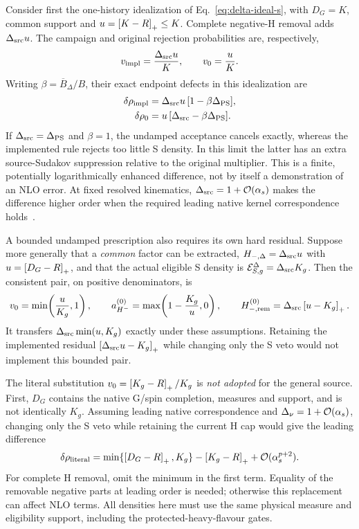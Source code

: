 Consider first the one-history idealization of
Eq.~\eqref{eq:delta-ideal-s}, with $D_G=K$, common support and
$u=\left[K-R\right]_+\leq K$.
Complete negative-H removal adds $\Delta_{\rm src}u$.
The campaign and original rejection probabilities are, respectively,
\begin{equation}
 v_{\rm impl}=\frac{\Delta_{\rm src}u}{K},
 \qquad v_0=\frac{u}{K}.
 \label{eq:delta-audit-veto}
\end{equation}
Writing $\beta=\overline B_\Delta/B$, their exact endpoint defects in
this idealization are
\begin{align}
 \delta\rho_{\rm impl}
   &=\Delta_{\rm src}u\,[1-\beta\Delta_{\rm PS}],\\
 \delta\rho_0&=u\,[\Delta_{\rm src}-\beta\Delta_{\rm PS}].
 \label{eq:delta-audit-defects}
\end{align}
If $\Delta_{\rm src}=\Delta_{\rm PS}$ and $\beta=1$, the undamped
acceptance cancels exactly, whereas the implemented rule rejects too
little S density. In this limit the latter has an extra source-Sudakov
suppression relative to the original multiplier.
This is a finite, potentially logarithmically enhanced difference,
not by itself a demonstration of an NLO error.
At fixed resolved kinematics, $\Delta_{\rm src}=1+\mathcal O(\alpha_s)$
makes the difference higher order when the required leading native
kernel correspondence holds~\cite[Eqs.~(3.6)--(3.8)]{DeltaMatching}.

A bounded undamped prescription also requires its own hard residual.
Suppose more generally that a \emph{common} factor can be extracted,
$H_{-,\Delta}=\Delta_{\rm src}u$ with
$u=\left[D_G-R\right]_+$, and that the actual eligible S density is
$\mathcal E_{S,g}^\Delta=\Delta_{\rm src}K_g$.
Then the consistent pair, on positive denominators, is
\begin{equation}
 v_0=\min\!\left(\frac{u}{K_g},1\right),\qquad
 a_{H^-}^{(0)}=\max\!\left(1-\frac{K_g}{u},0\right),\qquad
 H_{-,\rm rem}^{(0)}=\Delta_{\rm src}\left[u-K_g\right]_+.
 \label{eq:delta-audit-cap}
\end{equation}
It transfers $\Delta_{\rm src}\min(u,K_g)$ exactly under these
assumptions. Retaining the implemented residual
$\left[\Delta_{\rm src}u-K_g\right]_+$ while changing only the S veto would
not implement this bounded pair.

The literal substitution $v_0=\left[K_g-R\right]_+/K_g$ is \emph{not adopted}
for the general source. First, $D_G$ contains the native G/spin
completion, measures and support, and is not identically $K_g$.
Assuming leading native correspondence and $\Delta_\nu=1+\mathcal O(\alpha_s)$,
changing only the S veto while retaining the current H cap would give
the leading difference
\begin{equation}
 \delta\rho_{\rm literal}
  =\min\{\left[D_G-R\right]_+,K_g\}-\left[K_g-R\right]_+
       +\mathcal O(\alpha_s^{p+2}).
 \label{eq:delta-audit-leading}
\end{equation}
For complete H removal, omit the minimum in the first term.
Equality of the removable negative parts at leading order is needed;
otherwise this replacement can affect NLO terms.
All densities here must use the same physical measure and eligibility
support, including the protected-heavy-flavour gates.

